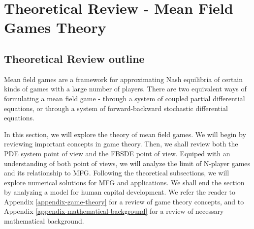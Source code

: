 \documentclass{article}
\begin{document}
\fi



\section{Theoretical Review - Mean Field Games Theory}

\subsection{Theoretical Review outline}

Mean field games are a framework for approximating Nash equilibria of certain kinds of games with a large number of players.
There are two equivalent ways of formulating a mean field game - through a system of coupled partial differential equations, or through a system of forward-backward stochastic differential equations.

In this section, we will explore the theory of mean field games.
We will begin by reviewing important concepts in game theory. 
Then, we shall review both the PDE system point of view and the FBSDE point of view. 
Equiped with an understanding of both point of views, we will analyze the limit of N-player games and its relationship to MFG.
Following the theoretical subsections, we will explore numerical solutions for MFG and applications.
We shall end the section by analyzing a model for human capital development.
We refer the reader to Appendix \ref{appendix-game-theory} for a review of game theory concepts, and to Appendix \ref{appendix-mathematical-background} for a review of necessary mathematical background.
\end{document}
